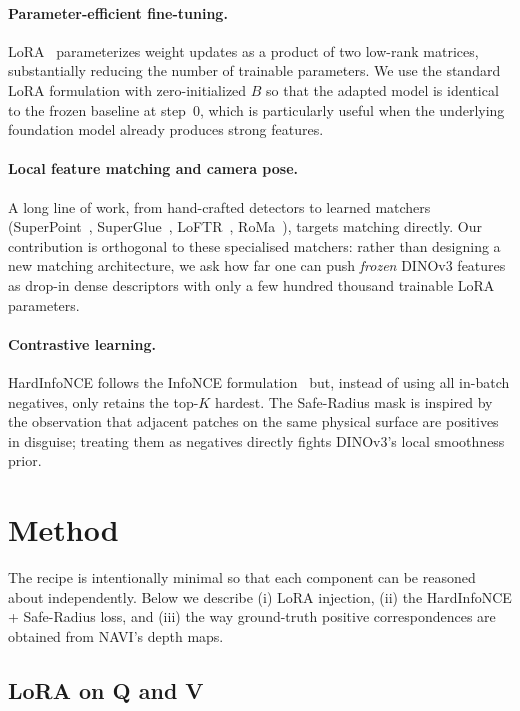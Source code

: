 \documentclass[10pt,twocolumn,letterpaper]{article}
\begin{document}
\paragraph{Parameter-efficient fine-tuning.} LoRA~\cite{lora}
parameterizes weight updates as a product of two low-rank matrices,
substantially reducing the number of trainable parameters. We use the
standard LoRA formulation with zero-initialized $B$ so that the
adapted model is identical to the frozen baseline at step~$0$, which is
particularly useful when the underlying foundation model already
produces strong features.

\paragraph{Local feature matching and camera pose.} A long line of
work, from hand-crafted detectors to learned matchers
(SuperPoint~\cite{superpoint}, SuperGlue~\cite{superglue},
LoFTR~\cite{loftr}, RoMa~\cite{roma}), targets matching directly. Our
contribution is orthogonal to these specialised matchers: rather than
designing a new matching architecture, we ask how far one can push
\emph{frozen} DINOv3 features as drop-in dense descriptors with only
a few hundred thousand trainable LoRA parameters.

\paragraph{Contrastive learning.} HardInfoNCE follows the InfoNCE
formulation~\cite{cpc,simclr} but, instead of using all in-batch
negatives, only retains the top-$K$ hardest. The Safe-Radius mask is
inspired by the observation that adjacent patches on the same physical
surface are positives in disguise; treating them as negatives directly
fights DINOv3's local smoothness prior.

\section{Method}
\label{sec:method}

The recipe is intentionally minimal so that each component can be
reasoned about independently. Below we describe (i) LoRA injection,
(ii) the HardInfoNCE + Safe-Radius loss, and (iii) the way ground-truth
positive correspondences are obtained from NAVI's depth maps.

\subsection{LoRA on Q and V}
\end{document}
